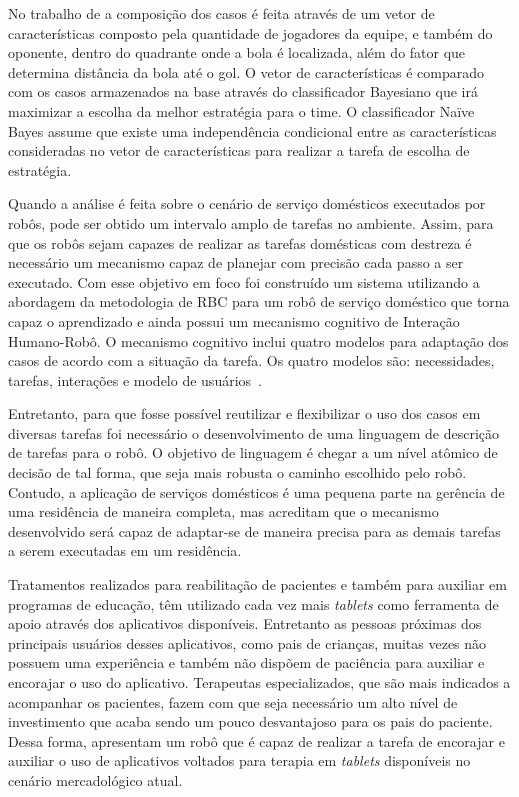 No trabalho de  a composição dos casos é feita através de um vetor de características composto pela quantidade de jogadores da equipe, e também do oponente, dentro do quadrante onde a bola é localizada, além do fator que determina distância da bola até o gol. O vetor de características é comparado com os casos armazenados na base através do classificador Bayesiano que irá maximizar a escolha da melhor estratégia para o time. O classificador Naïve Bayes assume que existe uma independência condicional entre as características consideradas no vetor de características para realizar a tarefa de escolha de estratégia.

Quando a análise é feita sobre o cenário de serviço domésticos executados por robôs, pode ser obtido um intervalo amplo de tarefas no ambiente. Assim, para que os robôs sejam capazes de realizar as tarefas domésticas com destreza é necessário um mecanismo capaz de planejar com precisão cada passo a ser executado. Com esse objetivo em foco foi construído um sistema utilizando a abordagem da metodologia de RBC para um robô de serviço doméstico que torna capaz o aprendizado e ainda possui um mecanismo cognitivo de Interação Humano-Robô. O mecanismo cognitivo inclui quatro modelos para adaptação dos casos de acordo com a situação da tarefa. Os quatro modelos são: necessidades, tarefas, interações e modelo de usuários~\cite{Jung:2007}.

Entretanto, para que fosse possível reutilizar e flexibilizar o uso dos casos em diversas tarefas foi necessário o desenvolvimento de uma linguagem de descrição de tarefas para o robô. O objetivo de linguagem é chegar a um nível atômico de decisão de tal forma, que seja mais robusta o caminho escolhido pelo robô. Contudo, a aplicação de serviços domésticos é uma pequena parte na gerência de uma residência de maneira completa, mas  acreditam que o mecanismo desenvolvido será capaz de adaptar-se de maneira precisa para as demais tarefas a serem executadas em um residência.

Tratamentos realizados para reabilitação de pacientes e também para auxiliar em programas de educação, têm utilizado cada vez mais \emph{tablets} como ferramenta de apoio através dos aplicativos disponíveis. Entretanto as pessoas próximas dos principais usuários desses aplicativos, como pais de crianças, muitas vezes não possuem uma experiência e também não dispõem de paciência para auxiliar e encorajar o uso do aplicativo. Terapeutas especializados, que são mais indicados a acompanhar os pacientes, fazem com que seja necessário um alto nível de investimento que acaba sendo um pouco desvantajoso para os pais do paciente. Dessa forma,  apresentam um robô que é capaz de realizar a tarefa de encorajar e auxiliar o uso de aplicativos voltados para terapia em \emph{tablets} disponíveis no cenário mercadológico atual.

